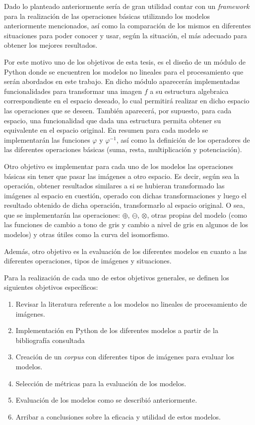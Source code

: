 Dado lo planteado anteriormente ser\'ia de gran utilidad contar con un \textit{framework} para la realizaci\'on de las operaciones b\'asicas utilizando los modelos anteriormente mencionados, as\'i como la comparaci\'on de los mismos en diferentes situaciones para poder conocer y usar, seg\'un la situaci\'on, el m\'as adecuado para obtener los mejores resultados.

Por este motivo uno de los objetivos de esta tesis, es el dise\~no de un m\'odulo de Python donde se encuentren los modelos no lineales para el procesamiento que ser\'an abordados en este trabajo. En dicho m\'odulo aparecer\'an implementadas funcionalidades para transformar una imagen $f$ a su estructura algebraica correspondiente en el espacio deseado, lo cual permitir\'a realizar en dicho espacio las operaciones que se deseen. Tambi\'en aparecer\'a, por supuesto, para cada espacio, una funcionalidad que dada una estructura permita obtener su equivalente en el espacio original. En resumen para cada modelo se implementar\'an las funciones $\varphi$ y $\varphi^{-1}$, as\'i como la definici\'on de los operadores de las diferentes operaciones b\'asicas (suma, resta, multiplicaci\'on y potenciaci\'on).

Otro objetivo es implementar para cada uno de los modelos las operaciones b\'asicas sin tener que pasar las im\'agenes a otro espacio. Es decir, seg\'un sea la operaci\'on, obtener resultados similares a si se hubieran transformado las im\'agenes al espacio en cuesti\'on, operado con dichas transformaciones y luego el resultado obtenido de dicha operaci\'on, transformarlo al espacio original. O sea, que se implementar\'an las operaciones: $\oplus$, $\ominus$, $\otimes$, otras propias del modelo (como las funciones de cambio a tono de gris y cambio a nivel de gris en algunos de los modelos) y otras \'utiles como la curva del isomorfismo.

Adem\'as, otro objetivo es la evaluaci\'on de los diferentes modelos en cuanto a las diferentes operaciones, tipos de im\'agenes y situaciones.

Para la realizaci\'on de cada uno de estos objetivos generales, se definen los siguientes objetivos espec\'ificos:

\begin{enumerate}
	\item Revisar la literatura referente a los modelos no lineales de procesamiento de im\'agenes.
	\item Implementaci\'on en Python de los diferentes modelos a partir de la bibliograf\'ia consultada
	\item Creaci\'on de un \textit{corpus} con diferentes tipos de im\'agenes para evaluar los modelos.
	\item Selecci\'on de m\'etricas para la evaluaci\'on de los modelos.
	\item Evaluaci\'on de los modelos como se describi\'o anteriormente.
	\item Arribar a conclusiones sobre la eficacia y utilidad de estos modelos. 
\end{enumerate}


